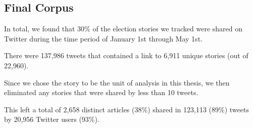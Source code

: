\subsection{Final Corpus}

In total, we found that 30\% of the election stories we tracked were shared on Twitter during the time period of January 1st through May 1st.

There were 137,986 tweets that contained a link to 6,911 unique stories (out of 22,960).

Since we chose the story to be the unit of analysis in this thesis, we then eliminated any stories that were shared by less than 10 tweets.

This left a total of 2,658 distinct articles (38\%) shared in 123,113 (89\%) tweets by 20,956 Twitter users (93\%).

 






















